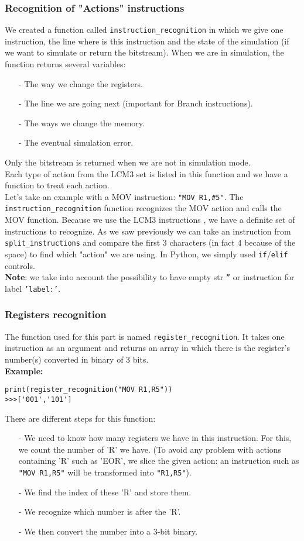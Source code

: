 \documentclass{article}
\newcommand{\code}[1]{\fontfamily{zi4}\texttt{#1}}
\begin{document}
\subsubsection{Recognition of "Actions" instructions}
We created a function called \code{instruction\_recognition} in which we give one instruction, the line where is this instruction and the state of the simulation (if we want to simulate or return the bitstream). When we are in simulation, the function returns several variables: 
\begin{itemize}
    \item[-]The way we change the registers.
    \item[-]The line we are going next (important for Branch instructions).
    \item[-]The ways we change the memory.
    \item[-]The eventual simulation error.
\end{itemize}
Only the bitstream is returned when we are not in simulation mode.\\
Each type of action from the LCM3 set is listed in this function and we have a function to treat each action.\\
Let's take an example with a MOV instruction: \code{"MOV R1,\#5"}.
The \code{instruction\_recognition} function recognizes the MOV action and calls the MOV function.
Because we use the LCM3 instructions%
, we have a definite set of instructions to recognize. As we saw previously we can take an instruction from \code{split\_instructions} and compare the first 3 characters (in fact 4 because of the space) to find which "action" we are using. In Python, we simply used \code{if}/\code{elif} controls.\\
\textbf{Note}: we take into account the possibility to have empty str \code{''} or instruction for label \code{'label:'}.

\subsubsection{Registers recognition}
The function used for this part is named \code{register\_recognition}. It takes one instruction as an argument and returns an array in which there is the register's number(s) converted in binary of 3 bits.\\
\textbf{Example:}
\begin{lstlisting}[language=MyPython]
print(register_recognition("MOV R1,R5"))
>>>['001','101']
\end{lstlisting}
There are different steps for this function:
\begin{itemize}
\item[-]We need to know how many registers we have in this instruction. For this, we count the number of 'R' we have. (To avoid any problem with actions containing 'R' such as 'EOR', we slice the given action: an instruction such as \code{"MOV R1,R5"} will be transformed into \code{"R1,R5"}).
\item[-]We find the index of these 'R' and store them.
\item[-]We recognize which number is after the 'R'.
\item[-]We then convert the number into a 3-bit binary.
\end{itemize}
\end{document}
